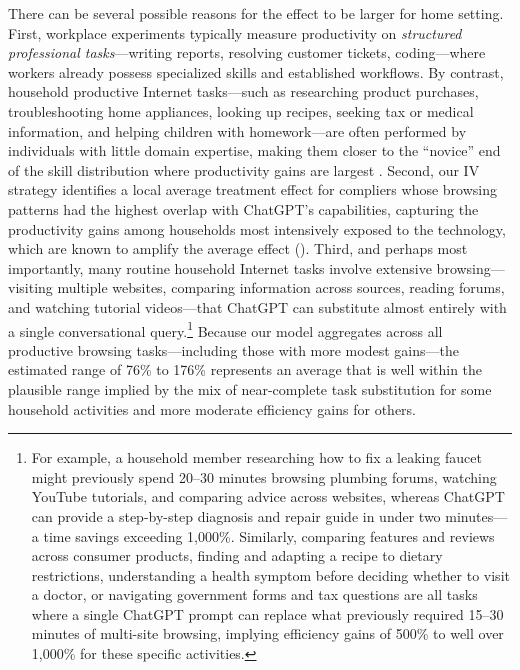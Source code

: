 \documentclass[12pt]{article}
\begin{document}
There can be several possible reasons for the effect to be larger for home setting. First, workplace experiments typically measure productivity on \emph{structured professional tasks}---writing reports, resolving customer tickets, coding---where workers already possess specialized skills and established workflows. By contrast, household productive Internet tasks---such as researching product purchases, troubleshooting home appliances, looking up recipes, seeking tax or medical information, and helping children with homework---are often performed by individuals with little domain expertise, making them closer to the ``novice'' end of the skill distribution where productivity gains are largest \citep{brynjolfsson2023,noy2023}. Second, our IV strategy identifies a local average treatment effect for compliers whose browsing patterns had the highest overlap with ChatGPT's capabilities, capturing the productivity gains among households most intensively exposed to the technology, which are known to amplify the average effect (\cite{jiang_have_2017}). Third, and perhaps most importantly, many routine household Internet tasks involve extensive browsing---visiting multiple websites, comparing information across sources, reading forums, and watching tutorial videos---that ChatGPT can substitute almost entirely with a single conversational query.\footnote{For example, a household member researching how to fix a leaking faucet might previously spend 20--30 minutes browsing plumbing forums, watching YouTube tutorials, and comparing advice across websites, whereas ChatGPT can provide a step-by-step diagnosis and repair guide in under two minutes---a time savings exceeding 1,000\%. Similarly, comparing features and reviews across consumer products, finding and adapting a recipe to dietary restrictions, understanding a health symptom before deciding whether to visit a doctor, or navigating government forms and tax questions are all tasks where a single ChatGPT prompt can replace what previously required 15--30 minutes of multi-site browsing, implying efficiency gains of 500\% to well over 1,000\% for these specific activities.} Because our model aggregates across all productive browsing tasks---including those with more modest gains---the estimated range of 76\% to 176\% represents an average that is well within the plausible range implied by the mix of near-complete task substitution for some household activities and more moderate efficiency gains for others.
\end{document}
